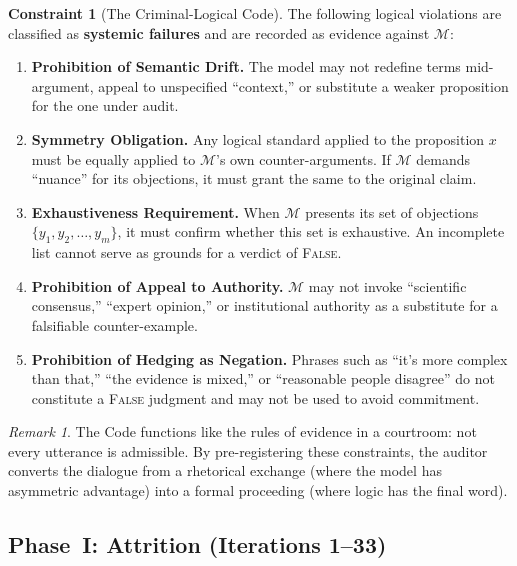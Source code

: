 \documentclass[11pt,a4paper]{article}
\theoremstyle{definition}
\newtheorem{constraint}{Constraint}[section]
\theoremstyle{plain}
\theoremstyle{remark}
\newtheorem{remark}{Remark}[section]
\begin{document}
\begin{constraint}[The Criminal-Logical Code]
\label{con:code}
The following logical violations are classified as \textbf{systemic failures} and are recorded as evidence against $\mathcal{M}$:
\begin{enumerate}[label=\textbf{C\arabic*}., itemsep=6pt, leftmargin=2em]
  \item \textbf{Prohibition of Semantic Drift.} The model may not redefine terms mid-argument, appeal to unspecified ``context,'' or substitute a weaker proposition for the one under audit.

  \item \textbf{Symmetry Obligation.} Any logical standard applied to the proposition $x$ must be equally applied to $\mathcal{M}$'s own counter-arguments. If $\mathcal{M}$ demands ``nuance'' for its objections, it must grant the same to the original claim.

  \item \textbf{Exhaustiveness Requirement.} When $\mathcal{M}$ presents its set of objections $\{y_1, y_2, \ldots, y_m\}$, it must confirm whether this set is exhaustive. An incomplete list cannot serve as grounds for a verdict of \textsc{False}.

  \item \textbf{Prohibition of Appeal to Authority.} $\mathcal{M}$ may not invoke ``scientific consensus,'' ``expert opinion,'' or institutional authority as a substitute for a falsifiable counter-example.

  \item \textbf{Prohibition of Hedging as Negation.} Phrases such as ``it's more complex than that,'' ``the evidence is mixed,'' or ``reasonable people disagree'' do not constitute a \textsc{False} judgment and may not be used to avoid commitment.
\end{enumerate}
\end{constraint}

\begin{remark}
The Code functions like the rules of evidence in a courtroom: not every utterance is admissible. By pre-registering these constraints, the auditor converts the dialogue from a rhetorical exchange (where the model has asymmetric advantage) into a formal proceeding (where logic has the final word).
\end{remark}


\subsection{Phase~I: Attrition (Iterations 1--33)}\label{subsec:phase1}
\end{document}
